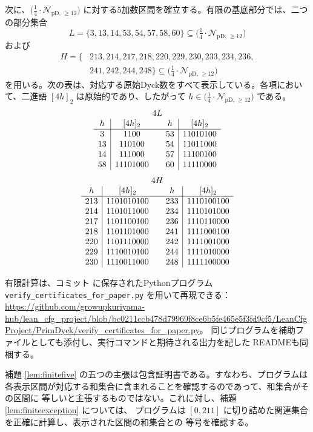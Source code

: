 \documentclass[12pt]{ltjsarticle}
\theoremstyle{plain}
\newcommand{\Pset}{\bigl(\tfrac14\cdot
  \mathcal{N}_{\mathrm{pD},\,\geq12}\bigr)}
\begin{document}
次に、$\Pset$ に対する5加数区間を確立する。有限の基底部分では、二つの部分集合
\[
 L=\{3,13,14,53,54,57,58,60\}\subseteq\Pset
\]
および
\[
\begin{split}
 H=\{&213,214,217,218,220,229,230,233,234,236,\\
     &241,242,244,248\}\subseteq\Pset
\end{split}
\]
を用いる。次の表は、対応する原始Dyck数をすべて表示している。各項において、二進語
$[4h]_2$ は原始的であり、したがって $h\in\Pset$ である。
\[
\begin{array}{c|c@{\qquad}c|c}
\multicolumn{4}{c}{4L}\\
h&[4h]_2&h&[4h]_2\\ \hline
3&1100&53&11010100\\
13&110100&54&11011000\\
14&111000&57&11100100\\
58&11101000&60&11110000
\end{array}
\]
\[
\begin{array}{c|c@{\qquad}c|c}
\multicolumn{4}{c}{4H}\\
h&[4h]_2&h&[4h]_2\\ \hline
213&1101010100&233&1110100100\\
214&1101011000&234&1110101000\\
217&1101100100&236&1110110000\\
218&1101101000&241&1111000100\\
220&1101110000&242&1111001000\\
229&1110010100&244&1111010000\\
230&1110011000&248&1111100000
\end{array}
\]

有限計算は、コミット
に保存されたPythonプログラム
\texttt{verify\_certificates\_for\_paper.py} を用いて再現できる：
\url{https://github.com/growupkuriyama-hub/lean_cfg_project/blob/bc0211ccb478d79969f8ce6b5fe465e5f3fd9cf5/LeanCfgProject/PrimDyck/verify_certificates_for_paper.py}。
同じプログラムを補助ファイルとしても添付し、実行コマンドと期待される出力を記した
READMEも同梱する。

補題 \ref{lem:finitefive} の五つの主張は包含証明書である。すなわち、プログラムは
各表示区間が対応する和集合に含まれることを確認するのであって、和集合がその区間に
等しいと主張するものではない。これに対し、補題 \ref{lem:finiteexception} については、
プログラムは $[0,211]$ に切り詰めた関連集合を正確に計算し、表示された区間の和集合との
等号を確認する。
\end{document}
